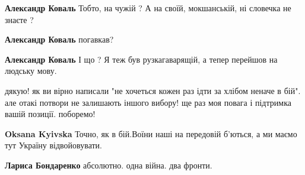 \begin{itemize}
\begin{itemize}
\textbf{Александр Коваль} Тобто, на чужій ? А на своїй, мокшанській, ні словечка не знаєте ?

 
\textbf{Александр Коваль} погавкав?

 
\textbf{Александр Коваль} І що ? Я теж був рузкагаварящій, а тепер перейшов на людську мову.

\end{itemize}

 

дякую! як ви вірно написали "не хочеться кожен раз ідти за хлібом неначе в
бій". але отакі потвори не залишають іншого вибору! ще раз моя повага і
підтримка вашій позиції. поборемо!

\begin{itemize}
 
\textbf{Oksana Kyivska} Точно, як в бій.Воїни наші на передовій б'ються, а ми маємо тут Україну відвойовувати.

 
\textbf{Лариса Бондаренко} абсолютно. одна війна. два фронти.
\end{itemize}

 

\end{itemize}
